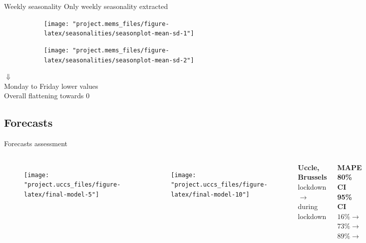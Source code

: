\documentclass{beamer}
\begin{document}
\begin{frame}{Weekly seasonality}\centering
	Only weekly seasonality extracted
	\begin{figure}
		\begin{subfigure}{.49\linewidth}
			\texttt{[image: "project.mems\_files/figure-latex/seasonalities/seasonplot-mean-sd-1"]}
		\end{subfigure}
		\begin{subfigure}{.49\linewidth}
			\texttt{[image: "project.mems\_files/figure-latex/seasonalities/seasonplot-mean-sd-2"]}
		\end{subfigure}
	\end{figure}
	\large$\Downarrow$\\
	\vspace{.3em}\normalsize Monday to Friday lower values\\
	\vspace{.3em}Overall flattening towards 0
\end{frame}

\subsection{Forecasts}

\begin{frame}{Forecasts assessment}
	\begin{columns}[c]
		\begin{figure}
			\texttt{[image: "project.uccs\_files/figure-latex/final-model-5"]}
		\end{figure}
		\begin{figure}
			\texttt{[image: "project.uccs\_files/figure-latex/final-model-10"]}
		\end{figure}
		\centering
		\textbf{Uccle, Brussels}\\
		lockdown $\rightarrow$ during lockdown\\~\\
		\begin{columns}[T]
			\raggedleft
			\textbf{MAPE}\\\textbf{80\% CI}\\\textbf{95\% CI}\\
			\raggedleft
			${16\%} \rightarrow$\\
			${73\%} \rightarrow$\\
			${89\%} \rightarrow$\\
			\raggedright
			$46\%$\\
			$39\%$\\
			$63\%$\\
		\end{columns}~\\
		$\Downarrow$\\
		Performance degradation
	\end{columns}
\end{frame}
\end{document}
